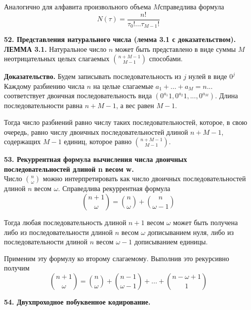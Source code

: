 \documentclass[14pt]{article}
\begin{document}
Аналогично для алфавита произвольного объема \(M\)справедлива формула
\begin{displaymath}
    N(\tau) =  \frac{n!}{\tau_0!...\tau_{M-1}!}
\end{displaymath}

\bigskip
\textbf{52. Представления натурального числа (лемма 3.1 с доказательством).} \\

\textbf{ЛЕММА 3.1.} Натуральное число \(n\) может быть представлено в
виде суммы \(M\) неотрицательных целых слагаемых \(\binom{n+M-1}{M-1}\) способами.

\textbf{Доказательство.} Будем записывать последовательность из \(j\) нулей в виде \(0^j\) Каждому разбиению числа \(n\) на целые слагаемые \(a_1 + ... + a_M = n...\) соответствует двоичная последовательность вида \((0^{a_1}1, 0^{a_2}1,...,0^{a_M})\). Длина последовательности равна \(n + M - 1\), а вес равен \(M - 1\).

Тогда число разбиений равно числу таких последовательностей, которое, в свою очередь, равно числу двоичных последовательностей длиной \(n + M - 1\), содержащих \(M - 1\) единиц, которое равно \(\binom{n+M-1}{M-1}\).

\bigskip
\textbf{53. Рекуррентная формула вычисления числа двоичных последовательностей длиной n весом w.} \\

Число \(\binom{n}{\omega}\) можно интерпретировать как число двоичных последовательностей длиной \(n\) весом \(\omega\). Справедлива рекуррентная формула
\begin{displaymath}
    \binom{n + 1}{\omega} = \binom{n}{\omega} + \binom{n}{\omega - 1}
\end{displaymath}

Тогда любая последовательность длиной \(n + 1\) весом \(\omega\) может быть получена либо из последовательности длиной \(n\) весом \(\omega\) дописыванием нуля, либо из последовательности длиной \(n\) весом \(\omega - 1\) дописыванием единицы.

Применим эту формулу ко второму слагаемому. Выполнив это рекурсивно получим
\begin{displaymath}
    \binom{n + 1}{\omega} = \binom{n}{\omega} + \binom{n - 1}{\omega - 1} + ... + \binom{n - \omega + 1}{1}
\end{displaymath}

\bigskip
\textbf{54. Двухпроходное побуквенное кодирование.} \\
\end{document}
